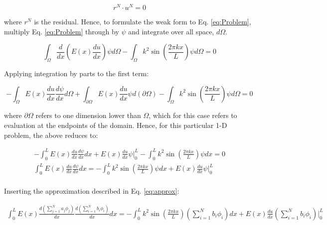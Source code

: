 \documentclass[10pt]{article}
\begin{document}
\begin{equation}
r^N\cdot u^N=0
\end{equation}

where \(r^N\) is the residual. Hence, to formulate the weak form to Eq. \eqref{eq:Problem}, multiply Eq. \eqref{eq:Problem} through by \(\psi\) and integrate over all space, \(d\Omega\).

\begin{equation}
\int_{\Omega}^{}\frac{d}{dx}\left(E(x)\frac{du}{dx}\right)\psi d\Omega-\int_{\Omega}^{}k^2\sin{\left(\frac{2\pi kx}{L}\right)}\psi d\Omega=0
\end{equation}

Applying integration by parts to the first term:

\begin{equation}
-\int_{\Omega}^{}E(x)\frac{du}{dx}\frac{d\psi}{dx}d\Omega+\int_{\partial\Omega}^{}E(x)\frac{du}{dx}\psi d(\partial\Omega)-\int_{\Omega}^{}k^2\sin{\left(\frac{2\pi kx}{L}\right)}\psi d\Omega=0
\end{equation}

where \(\partial\Omega\) refers to one dimension lower than \(\Omega\), which for this case refers to evaluation at the endpoints of the domain. Hence, for this particular 1-D problem, the above reduces to:

\begin{equation}
\begin{aligned}
-\int_{0}^{L}E(x)\frac{du}{dx}\frac{d\psi}{dx}dx+ E(x)\frac{du}{dx}\psi\biggr\vert_{0}^{L}-\int_{0}^{L}k^2\sin{\left(\frac{2\pi kx}{L}\right)}\psi dx=0\\
\int_{0}^{L}E(x)\frac{du}{dx}\frac{d\psi}{dx}dx=-\int_{0}^{L}k^2\sin{\left(\frac{2\pi kx}{L}\right)}\psi dx+E(x)\frac{du}{dx}\psi\biggr\vert_{0}^{L}\\
\end{aligned}
\end{equation}

Inserting the approximation described in Eq. \eqref{eq:approx}:

\begin{equation}
\begin{aligned}
\int_{0}^{L}E(x)\frac{d\left(\sum_{j=1}^{N}a_j\phi_j\right)}{dx}\frac{d\left(\sum_{i=1}^{N}b_i\phi_i\right)}{dx}dx=-\int_{0}^{L}k^2\sin{\left(\frac{2\pi kx}{L}\right)}\left(\sum_{i=1}^{N}b_i\phi_i\right)dx+E(x)\frac{du}{dx}\left(\sum_{i=1}^{N}b_i\phi_i\right)\biggr\vert_{0}^{L}\\
\end{aligned}
\end{equation}
\end{document}
